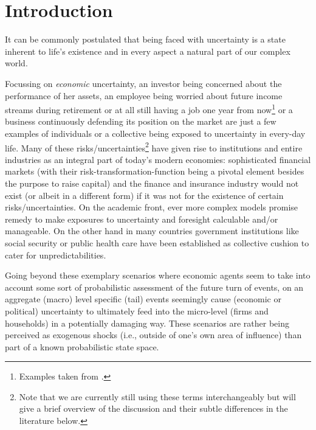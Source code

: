 \documentclass[a4paper,11pt,listof=nochaptergap,oneside,pointednumbers,bibtotoc,bigheadings,liststotoc,hidelinks]{scrbook}
\theoremstyle{mysatz}
\theoremstyle{mydefinition}
\theoremstyle{mytheorem}
\theoremstyle{mybemerkung}
\begin{document}
\chapter{Introduction}
\label{introduction}
It can be commonly postulated that being faced with uncertainty is a state inherent to life's existence and in every aspect a natural part of our complex world.

Focussing on \textit{economic} uncertainty, an investor being concerned about the performance of her assets, an employee being worried about future income streams during retirement or at all still having a job one year from now\footnote{Examples taken from \citet{stockhammerramskogler:07}.} or a business continuously defending its position on the market are just a few examples of individuals or a collective being exposed to uncertainty in every-day life. Many of these risks/uncertainties\footnote{Note that we are currently still using these terms interchangeably but will give a brief overview of the discussion and their subtle differences in the literature below.} have given rise to institutions and entire industries as an integral part of today's modern economies: sophisticated financial markets (with their risk-transformation-function being a pivotal element besides the purpose to raise capital) and the finance and insurance industry would not exist (or albeit in a different form) if it was not for the existence of certain risks/uncertainties. On the academic front, ever more complex models promise remedy to make exposures to uncertainty and foresight calculable and/or manageable. On the other hand in many countries government institutions like social security or public health care have been established as collective cushion to cater for unpredictabilities.

Going beyond these exemplary scenarios where economic agents seem to take into account some sort of probabilistic assessment of the future turn of events, on an aggregate (macro) level specific (tail) events seemingly cause (economic or political) uncertainty to ultimately feed into the micro-level (firms and households) in a potentially damaging way. These scenarios are rather being perceived as exogenous shocks (i.e., outside of one's own area of influence) than part of a known probabilistic state space.
\end{document}
